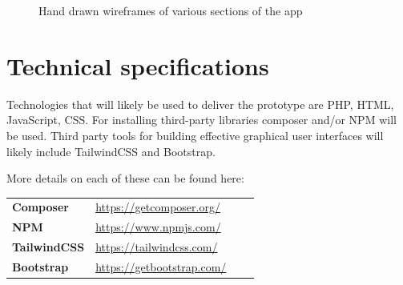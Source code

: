 \documentclass[11pt]{article}
\begin{document}
\begin{figure}[h]
    \qquad
    \caption{Hand drawn wireframes of various sections of the app}%
    \label{fig:wireframes}%
\end{figure}

\section{Technical specifications}

Technologies that will likely be used to deliver the prototype are
PHP, HTML, JavaScript, CSS. For installing third-party libraries composer 
and/or NPM will be used. Third party tools for building effective graphical user
interfaces will likely include TailwindCSS and Bootstrap.

More details on each of these can be found here: 

\begin{table}[t]
	\centering
	\begin{tabular}{llll} 
		\toprule
		\textbf{Composer} & \url{https://getcomposer.org/} \\
		\textbf{NPM} & \url{https://www.npmjs.com/}\\
		\textbf{TailwindCSS} & \url{https://tailwindcss.com/} \\
		\textbf{Bootstrap} & \url{https://getbootstrap.com/} \\
	\end{tabular}
\end{table}
\end{document}
